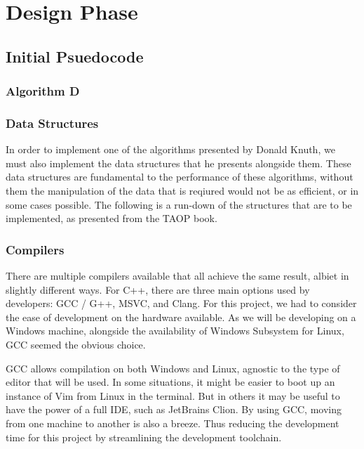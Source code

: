 \documentclass{article}
\begin{document}
\newpage
\section{Design Phase}
\subsection{Initial Psuedocode}
\subsubsection{Algorithm D}

\subsubsection{Data Structures}
In order to implement one of the algorithms presented by Donald Knuth, we must also implement the data structures that he presents alongside
them. These data structures are fundamental to the performance of these algorithms, without them the manipulation of the data that is
reqiured would not be as efficient, or in some cases possible. The following is a run-down of the structures that are to be implemented, as
presented from the TAOP book.


\subsubsection{Compilers}
There are multiple compilers available that all achieve the same result, albiet in slightly different ways. For C++, there are three main 
options used by developers: GCC / G++, MSVC, and Clang. For this project, we had to consider the ease of development on the hardware
available. As we will be developing on a Windows machine, alongside the availability of Windows Subsystem for Linux, GCC seemed the obvious
choice.

GCC allows compilation on both Windows and Linux, agnostic to the type of editor that will be used. In some situations, it might be easier to
boot up an instance of Vim from Linux in the terminal. But in others it may be useful to have the power of a full IDE, such as JetBrains
Clion. By using GCC, moving from one machine to another is also a breeze. Thus reducing the development time for this project by
streamlining the development toolchain.
\end{document}
